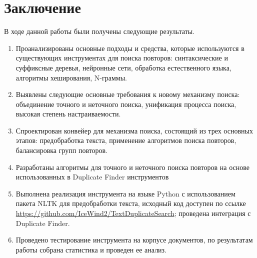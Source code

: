 \documentclass[14pt]{matmex-diploma-custom}
\begin{document}
\section*{Заключение}
В ходе данной работы были получены следующие результаты.
\begin{enumerate}
   	\item Проанализированы основные подходы и средства, которые используются в существующих инструментах для поиска повторов: синтаксические и суффиксные деревья, нейронные сети, обработка естественного языка, алгоритмы хеширования, N-граммы.
   	\item Выявлены следующие основные требования к новому механизму поиска: объединение точного и неточного поиска, унификация процесса поиска, высокая степень настраиваемости.
   	\item Спроектирован конвейер для механизма поиска, состоящий из трех основных этапов: предобработка текста, применение алгоритмов поиска повторов, балансировка групп повторов.
   	\item Разработаны алгоритмы для точного и неточного поиска повторов на основе использованных в Duplicate Finder инструментов
   	\item Выполнена реализация инструмента на языке Python с использованием пакета NLTK для предобработки текста, исходный код доступен по ссылке \mbox{\url{https://github.com/IceWind2/TextDuplicateSearch}}; проведена интеграция с Duplicate Finder.
   	\item Проведено тестирование инструмента на корпусе документов, по результатам работы собрана статистика и проведен ее анализ.
\end{enumerate}


\setmonofont[Mapping=tex-text]{CMU Typewriter Text}


\end{document}
